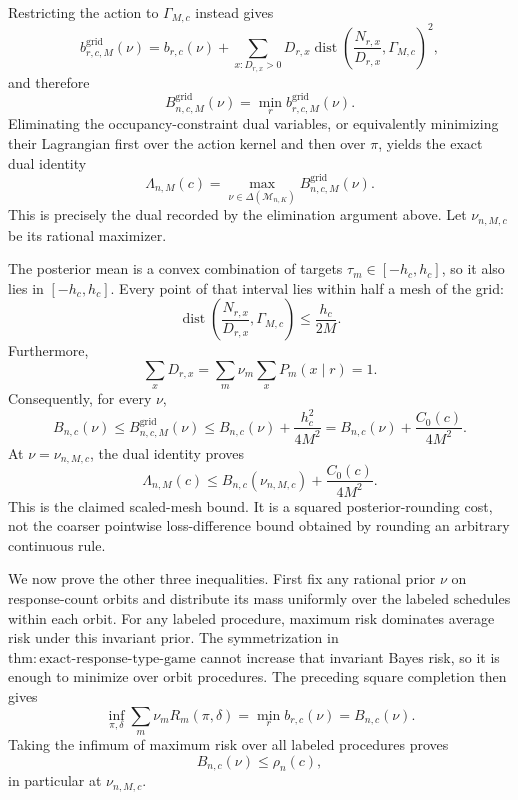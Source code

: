 Restricting the action to \(\Gamma_{M,c}\) instead gives
\[
 b^{\mathrm{grid}}_{r,c,M}(\nu)
 =b_{r,c}(\nu)+
 \sum_{x:D_{r,x}>0}D_{r,x}
 \operatorname{dist}\!\left(
 \frac{N_{r,x}}{D_{r,x}},\Gamma_{M,c}\right)^2,
\]
and therefore
\[
 B^{\mathrm{grid}}_{n,c,M}(\nu)
 =\min_r b^{\mathrm{grid}}_{r,c,M}(\nu).
\]
Eliminating the occupancy-constraint dual variables, or equivalently minimizing their Lagrangian first over the action kernel and then over \(\pi\), yields the exact dual identity
\[
 \Lambda_{n,M}(c)
 =\max_{\nu\in\Delta(\mathcal M_{n,K})}
 B^{\mathrm{grid}}_{n,c,M}(\nu).
\]
This is precisely the dual recorded by the elimination argument above.  Let \(\nu_{n,M,c}\) be its rational maximizer.

The posterior mean is a convex combination of targets \(\tau_m\in[-h_c,h_c]\), so it also lies in \([-h_c,h_c]\).  Every point of that interval lies within half a mesh of the grid:
\[
 \operatorname{dist}\!\left(
 \frac{N_{r,x}}{D_{r,x}},\Gamma_{M,c}\right)
 \leq\frac{h_c}{2M}.
\]
Furthermore,
\[
 \sum_xD_{r,x}
 =\sum_m\nu_m\sum_xP_m(x\mid r)=1.
\]
Consequently, for every \(\nu\),
\[
 B_{n,c}(\nu)\leq B^{\mathrm{grid}}_{n,c,M}(\nu)
 \leq B_{n,c}(\nu)+\frac{h_c^2}{4M^2}
 =B_{n,c}(\nu)+\frac{C_0(c)}{4M^2}.
\]
At \(\nu=\nu_{n,M,c}\), the dual identity proves
\[
 \Lambda_{n,M}(c)
 \leq B_{n,c}(\nu_{n,M,c})+\frac{C_0(c)}{4M^2}.
\]
This is the claimed scaled-mesh bound.  It is a squared posterior-rounding cost, not the coarser pointwise loss-difference bound obtained by rounding an arbitrary continuous rule.

We now prove the other three inequalities.  First fix any rational prior \(\nu\) on response-count orbits and distribute its mass uniformly over the labeled schedules within each orbit.  For any labeled procedure, maximum risk dominates average risk under this invariant prior.  The symmetrization in \(\mathrm{thm:exact\text{-}response\text{-}type\text{-}game}\) cannot increase that invariant Bayes risk, so it is enough to minimize over orbit procedures.  The preceding square completion then gives
\[
 \inf_{\pi,\delta}\sum_m\nu_mR_m(\pi,\delta)
 =\min_rb_{r,c}(\nu)=B_{n,c}(\nu).
\]
Taking the infimum of maximum risk over all labeled procedures proves
\[
 B_{n,c}(\nu)\leq\rho_n(c),
\]
in particular at \(\nu_{n,M,c}\).

